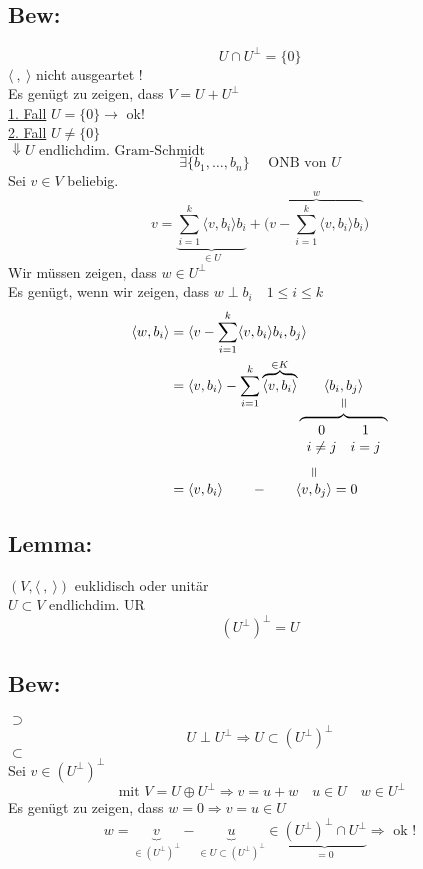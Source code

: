 \documentclass[titlepage,12pt,a4paper,ngerman]{report}
\newcommand{\verteq}{\rotatebox{90}{$\,=$}}
\newcommand{\equalto}[2]{\underset{\scriptstyle\overset{\mkern4mu\verteq}{#2}}{#1}}
\newcommand{\equaltoup}[2]{\overset{\scriptstyle\underset{\mkern4mu\verteq}{#2}}{#1}}
\newcommand{\tx}[1]{\textrm{#1}}
\newcommand{\ub}[1]{\underbrace{#1}}
\begin{document}
\subsection{Bew:}
$$U \cap U^\perp = \{0\}$$
$ \langle\ ,\ \rangle $ nicht ausgeartet !\\
Es genügt zu zeigen, dass $ V = U + U^\perp $\\
\underline{1. Fall} $ U = \{0\} \rightarrow$ ok! \\
\underline{2. Fall} $ U \neq \{0\} $\\
$ \Downarrow U \tx{ endlichdim. Gram-Schmidt} $\\
$$ \exists \{ b_1,\dots, b_n \} \quad \tx{ ONB von } U$$
Sei $ v \in V $ beliebig.
$$ v = \ub{\sum_{i=1}^{k} \langle v, b_i \rangle b_i}_{ \in U } + \bigg( \overbrace{ v - \sum_{i=1}^{k} \langle v, b_i\rangle b_i }^{w} \bigg)$$
Wir müssen zeigen, dass $ w \in U^\perp $\\[5pt]
Es genügt, wenn wir zeigen,	dass $  w \perp b_i \quad 1 \le i \le k $
\begin{align*}
\langle w, b_i \rangle &= \langle v - \sum_{i=1}^{k} \langle v, b_i \rangle b_i , b_j \rangle\\
&= \langle v, b_i \rangle - \sum_{i=1}^{k} \overbrace{\langle v , b_i \rangle}^{ \in K } \equalto{\langle b_i,b_j \rangle}{\overbrace{\begin{array}{cc}
		0 & 1 \\
		i\neq j & i = j
		\end{array}}}\\
&= \langle v,b_i \rangle\qquad  -\qquad  \equaltoup{\langle v,b_j \rangle}{} = 0
\end{align*}
\subsection{Lemma:}
$ (V, \langle\ ,\ \rangle) $ euklidisch oder unitär\\
$ U \subset V $ endlichdim. UR
$$ (U^\perp)^\perp = U$$
\subsection{Bew:}
$ \boxed{\supset} $\\
$$ U \perp U^\perp \Rightarrow U \subset (U^\perp)^\perp $$
$ \boxed{\subset} $\\
Sei $  v \in (U^\perp)^\perp $\\
$$ \tx{ mit } V = U \oplus U^\perp \Rightarrow  v = u + w \quad u \in U \quad w \in U^\perp$$
Es genügt zu zeigen, dass $ w = 0 \Rightarrow v = u \in U $
$$ w = \ub{v}_{\in (U^\perp)^\perp} - \ub{u}_{\in U \subset (U^\perp)^\perp} \in \ub{(U^\perp)^\perp \cap U^\perp}_{= 0} \Rightarrow \tx{ ok !}$$
\end{document}
